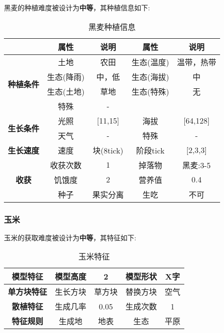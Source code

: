 黑麦的种植难度被设计为\textbf{中等}，其种植信息如下:

\begin{table}[H]
    \centering
    \caption{黑麦种植信息}
    \label{table:黑麦种植信息}
    \setlength{\tabcolsep}{4mm}
    \begin{tabular}{c|cc|cc}
        \toprule
                                           & \textbf{属性} & \textbf{说明}   & \textbf{属性} & \textbf{说明} \\
        \midrule
        \multirow{4}{*}{\textbf{种植条件}} & 土地          & 农田            & 生态(温度)    & 温带，热带    \\
                                           & 生态(降雨)    & 中，低          & 生态(海拔)    & 中       \\
                                           & 生态(土地)    & 草地            & 生态(特殊)    & 无            \\
                                           & 特殊          & -                                \\
        \midrule
        \multirow{2}{*}{\textbf{生长条件}} & 光照          & [11,15]         & 海拔          & [64,128]      \\
                                           & 天气          & -              & 特殊          & -      \\
        \midrule
        \textbf{生长速度}                  & 速度          & 块(8tick)       & 阶段tick      & [2,3,3]       \\
        \midrule
        \multirow{3}{*}{\textbf{收获}}     & 收获次数      & 1               & 掉落物        & 黑麦:3-5      \\
                                           & 饥饿度        & 2               & 营养值        & 0.4           \\
                                           & 种子          & 果实分离        & 生吃          & 不可          \\
        \bottomrule
    \end{tabular}
\end{table}

\subsubsection{玉米}

玉米的获取难度被设计为\textbf{中等}，其特征如下:
\begin{table}[H]
    \centering
    \caption{玉米特征}
    \label{table:玉米特征}
    \setlength{\tabcolsep}{4mm}
    \begin{tabular}{c|cc|cc}
        \toprule
        \textbf{模型特征}   & 模型高度 & 2      & 模型形状 & X字  \\
        \midrule
        \textbf{单方块特征} & 生长方块 & 草方块 & 替换方块 & 空气 \\
        \midrule
        \textbf{散植特征}   & 生成几率 & 0.05   & 生成次数 & 1    \\
        \midrule
        \textbf{特征规则}   & 生成地   & 地表   & 生态     & 平原 \\
        \bottomrule
    \end{tabular}
\end{table}


